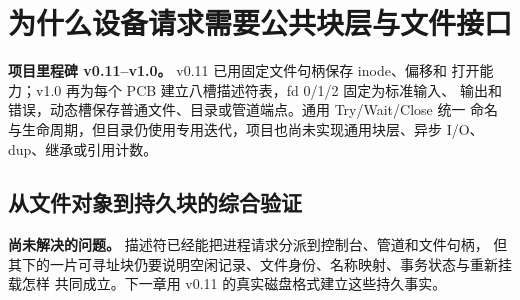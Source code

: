 \chapter{为什么设备请求需要公共块层与文件接口}

\begin{statebox}
\textbf{项目里程碑 v0.11--v1.0。} v0.11 已用固定文件句柄保存 inode、偏移和
打开能力；v1.0 再为每个 PCB 建立八槽描述符表，fd 0/1/2 固定为标准输入、
输出和错误，动态槽保存普通文件、目录或管道端点。通用 Try/Wait/Close 统一
命名与生命周期，但目录仍使用专用迭代，项目也尚未实现通用块层、异步 I/O、
dup、继承或引用计数。
\end{statebox}



\section{从文件对象到持久块的综合验证}

\begin{problemframe}
\textbf{尚未解决的问题。} 描述符已经能把进程请求分派到控制台、管道和文件句柄，
但其下的一片可寻址块仍要说明空闲记录、文件身份、名称映射、事务状态与重新挂载怎样
共同成立。下一章用 v0.11 的真实磁盘格式建立这些持久事实。
\end{problemframe}
